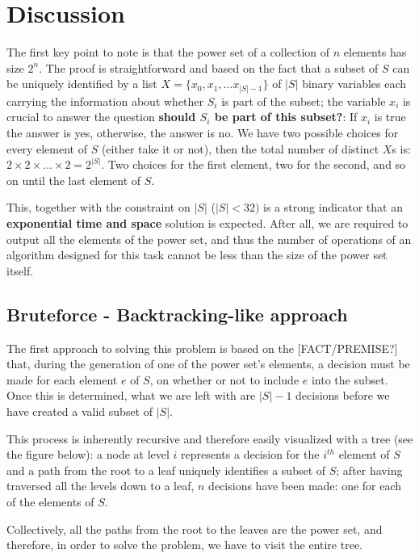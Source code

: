 \section{Discussion}
\label{sec:powerset:discussion}

The first key point to note is that the power set of a collection of $n$ elements has size $2^n$. The proof is straightforward and based on the fact that a subset of $S$ can be uniquely identified by a list $X=\{x_0,x_1,\ldots x_{|S|-1}\}$ of $|S|$ binary variables each carrying the information about whether $S_i$ is part of the subset; the variable $x_i$ is crucial to answer the question \textbf{should $S_i$ be part of this subset?}: If $x_i$ is true the answer is yes, otherwise, the answer is no.
We have two possible choices for every element of $S$ (either take it or not), then the total number of distinct $X$s  is: $2 \times 2 \times \ldots \times 2 = 2^{|S|}$. Two choices for the first element, two for the second, and so 
on until the last element of $S$.
  
This, together with the constraint on $|S|$ ($|S| < 32)$ is a strong indicator that an \textbf{exponential time and space} solution is expected.
After all, we are required to output all the elements of the power set, and thus the number of operations of an algorithm designed for this task cannot be less than the size of the power set itself. 



\subsection{Bruteforce - Backtracking-like approach}

The first approach to solving this problem is based on the [FACT/PREMISE?] that,  during the generation of
one of the power set's elements, a decision must be made for each element $e$ of $S$, on whether or not to include $e$ into the subset.
Once this is determined, what we are left with are $|S|-1$ decisions
before we have created a valid subset of $|S|$.

This process is inherently recursive and therefore easily visualized with a tree (see the figure below): a node at level $i$
represents a decision for the $i^{th}$ element of $S$ and a path from the root to a leaf uniquely
identifies a subset of $S$; after having traversed all the levels down to a leaf, $n$ decisions have been made: 
one for each of the elements of $S$. 

Collectively, all the paths from the root to the leaves are the power set, and therefore, in
order to solve the problem, we have to visit the entire tree.


